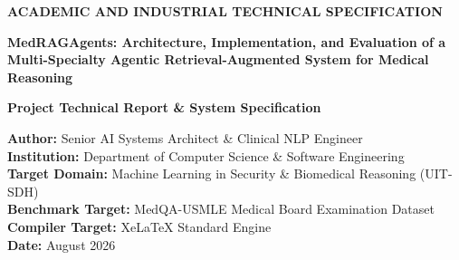 \documentclass[11pt,a4paper]{article}
\begin{document}
\begin{titlepage}
  \centering
  \vspace*{1.5cm}
  
  {\Large\bfseries ACADEMIC AND INDUSTRIAL TECHNICAL SPECIFICATION\par}
  \vspace{1.5cm}
  
  {\huge\bfseries MedRAGAgents: Architecture, Implementation, and Evaluation of a Multi-Specialty Agentic Retrieval-Augmented System for Medical Reasoning\par}
  
  \vspace{1.5cm}
  {\Large\bfseries Project Technical Report \& System Specification\par}
  
  \vspace{2.0cm}
  \textbf{Author:} Senior AI Systems Architect \& Clinical NLP Engineer\\
  \textbf{Institution:} Department of Computer Science \& Software Engineering\\
  \textbf{Target Domain:} Machine Learning in Security \& Biomedical Reasoning (UIT-SDH)\\
  \textbf{Benchmark Target:} MedQA-USMLE Medical Board Examination Dataset\\
  \textbf{Compiler Target:} XeLaTeX Standard Engine\\
  \textbf{Date:} August 2026
  
  \vfill
  

\end{titlepage}
\end{document}

